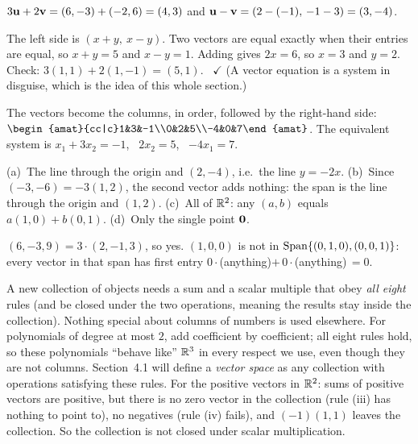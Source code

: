 \documentclass[11pt]{article}
\begin{document}
\begin{description}[leftmargin=0pt,itemsep=5pt]
  \item[Knowledge Check \ref{kc:compute}.] $3\mathbf{u}+2\mathbf{v}=(6,-3)+(-2,6)=(4,3)$ and $\mathbf{u}-\mathbf{v}=(2-(-1),\,-1-3)=(3,-4)$.
  \item[Knowledge Check \ref{kc:vecequal}.] The left side is $(x+y,\ x-y)$. Two vectors are equal exactly when their entries are equal, so
        $x+y=5$ and $x-y=1$. Adding gives $2x=6$, so $x=3$ and $y=2$. Check: $3(1,1)+2(1,-1)=(5,1)$. \ $\checkmark$ (A vector equation is
        a system in disguise, which is the idea of this whole section.)
  \item[Knowledge Check \ref{kc:augmatrix}.] The vectors become the columns, in order, followed by the right-hand side:
        $\begin{amat}{cc|c}1&3&-1\\0&2&5\\-4&0&7\end{amat}$. The equivalent system is $x_1+3x_2=-1$, \ $2x_2=5$, \ $-4x_1=7$.
  \item[Knowledge Check \ref{kc:spans}.] (a)~The line through the origin and $(2,-4)$, i.e.\ the line $y=-2x$.
        (b)~Since $(-3,-6)=-3(1,2)$, the second vector adds nothing: the span is the line through the origin and $(1,2)$.
        (c)~All of $\mathbb{R}^2$: any $(a,b)$ equals $a(1,0)+b(0,1)$. (d)~Only the single point $\mathbf{0}$.
  \item[Knowledge Check \ref{kc:member}.] $(6,-3,9)=3\cdot(2,-1,3)$, so yes. $(1,0,0)$ is not in $\operatorname{Span}\{(0,1,0),(0,0,1)\}$: every vector in that
        span has first entry $0\cdot$(anything)$+\,0\cdot$(anything)$\,=0$.
  \item[Pause and think \ref{think:axioms}.] A new collection of objects needs a sum and a scalar multiple that obey \emph{all eight} rules (and be closed under
        the two operations, meaning the results stay inside the collection). Nothing special about columns of numbers is used elsewhere.
        For polynomials of degree at most $2$, add coefficient by coefficient; all eight rules hold, so these
        polynomials ``behave like'' $\mathbb{R}^3$ in every respect we use, even though they are not columns. Section~4.1 will define a
        \emph{vector space} as any collection with operations satisfying these rules. For the positive vectors in $\mathbb{R}^2$: sums of
        positive vectors are positive, but there is no zero vector in the collection (rule (iii) has nothing to point to), no negatives
        (rule (iv) fails), and $(-1)(1,1)$ leaves the collection. So the collection is not closed under scalar multiplication.

\end{description}
\end{document}

